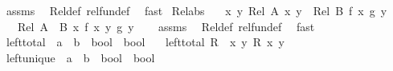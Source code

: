 \begin{isabellebody}
%
\isatagproof
{}\isamarkupfalse%
\ assms\ \isamarkupfalse%
\ Rel{\isacharunderscore}{\kern0pt}def\ rel{\isacharunderscore}{\kern0pt}fun{\isacharunderscore}{\kern0pt}def\ \isamarkupfalse%
\ fast%
\endisatagproof
{\isafoldproof}%
%
\isadelimproof
\isanewline
%
\endisadelimproof
\isanewline
{}\isamarkupfalse%
\ Rel{\isacharunderscore}{\kern0pt}abs{\isacharcolon}{\kern0pt}\isanewline
\ \ \ {\isachardoublequoteopen}{\isasymAnd}x\ y{\isachardot}{\kern0pt}\ Rel\ A\ x\ y\ {\isasymLongrightarrow}\ Rel\ B\ {\isacharparenleft}{\kern0pt}f\ x{\isacharparenright}{\kern0pt}\ {\isacharparenleft}{\kern0pt}g\ y{\isacharparenright}{\kern0pt}{\isachardoublequoteclose}\isanewline
\ \ \ {\isachardoublequoteopen}Rel\ {\isacharparenleft}{\kern0pt}A\ {\isacharequal}{\kern0pt}{\isacharequal}{\kern0pt}{\isacharequal}{\kern0pt}{\isachargreater}{\kern0pt}\ B{\isacharparenright}{\kern0pt}\ {\isacharparenleft}{\kern0pt}{\isasymlambda}x{\isachardot}{\kern0pt}\ f\ x{\isacharparenright}{\kern0pt}\ {\isacharparenleft}{\kern0pt}{\isasymlambda}y{\isachardot}{\kern0pt}\ g\ y{\isacharparenright}{\kern0pt}{\isachardoublequoteclose}\isanewline
%
\isadelimproof
\ \ %
\endisadelimproof
%
\isatagproof
{}\isamarkupfalse%
\ assms\ \isamarkupfalse%
\ Rel{\isacharunderscore}{\kern0pt}def\ rel{\isacharunderscore}{\kern0pt}fun{\isacharunderscore}{\kern0pt}def\ \isamarkupfalse%
\ fast%
\endisatagproof
{\isafoldproof}%
%
\isadelimproof
%
\endisadelimproof
%
\isadelimdocument
%
\endisadelimdocument
%
\isatagdocument
%
\isamarkuptrue%
%
\endisatagdocument
{\isafolddocument}%
%
\isadelimdocument
%
\endisadelimdocument
{}\isamarkupfalse%
\ left{\isacharunderscore}{\kern0pt}total\ {\isacharcolon}{\kern0pt}{\isacharcolon}{\kern0pt}\ {\isachardoublequoteopen}{\isacharparenleft}{\kern0pt}{\isacharprime}{\kern0pt}a\ {\isasymRightarrow}\ {\isacharprime}{\kern0pt}b\ {\isasymRightarrow}\ bool{\isacharparenright}{\kern0pt}\ {\isasymRightarrow}\ bool{\isachardoublequoteclose}\isanewline
\ \ \ {\isachardoublequoteopen}left{\isacharunderscore}{\kern0pt}total\ R\ {\isasymlongleftrightarrow}\ {\isacharparenleft}{\kern0pt}{\isasymforall}x{\isachardot}{\kern0pt}\ {\isasymexists}y{\isachardot}{\kern0pt}\ R\ x\ y{\isacharparenright}{\kern0pt}{\isachardoublequoteclose}\isanewline
\isanewline
{}\isamarkupfalse%
\ left{\isacharunderscore}{\kern0pt}unique\ {\isacharcolon}{\kern0pt}{\isacharcolon}{\kern0pt}\ {\isachardoublequoteopen}{\isacharparenleft}{\kern0pt}{\isacharprime}{\kern0pt}a\ {\isasymRightarrow}\ {\isacharprime}{\kern0pt}b\ {\isasymRightarrow}\ bool{\isacharparenright}{\kern0pt}\ {\isasymRightarrow}\ bool{\isachardoublequoteclose}\isanewline

\end{isabellebody}
